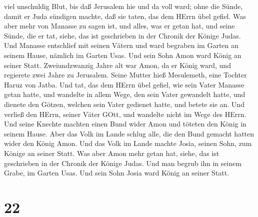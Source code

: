viel unschuldig Blut, bis daß Jerusalem hie und da voll ward; ohne die
Sünde, damit er Juda sündigen machte, daß sie taten, das dem HErrn übel
gefiel.  Was aber mehr von Manasse zu sagen ist, und alles,
was er getan hat, und seine Sünde, die er tat, siehe, das ist
geschrieben in der Chronik der Könige Judas.  Und Manasse
entschlief mit seinen Vätern und ward begraben im Garten an seinem
Hause, nämlich im Garten Usas. Und sein Sohn Amon ward König an seiner
Statt.  Zweiundzwanzig Jahre alt war Amon, da er König
ward, und regierete zwei Jahre zu Jerusalem. Seine Mutter hieß
Mesulemeth, eine Tochter Haruz von Jatba.  Und tat, das dem
HErrn übel gefiel, wie sein Vater Manasse getan hatte,  und
wandelte in allem Wege, den sein Vater gewandelt hatte, und dienete den
Götzen, welchen sein Vater gedienet hatte, und betete sie an.
 Und verließ den HErrn, seiner Väter GOtt, und wandelte
nicht im Wege des HErrn.  Und seine Knechte machten einen
Bund wider Amon und töteten den König in seinem Hause. 
Aber das Volk im Lande schlug alle, die den Bund gemacht hatten wider
den König Amon. Und das Volk im Lande machte Josia, seinen Sohn, zum
Könige an seiner Statt.  Was aber Amon mehr getan hat,
siehe, das ist geschrieben in der Chronik der Könige Judas.
 Und man begrub ihn in seinem Grabe, im Garten Usas. Und
sein Sohn Josia ward König an seiner Statt.

\hypertarget{section-21}{%
\section{22}\label{section-21}}

